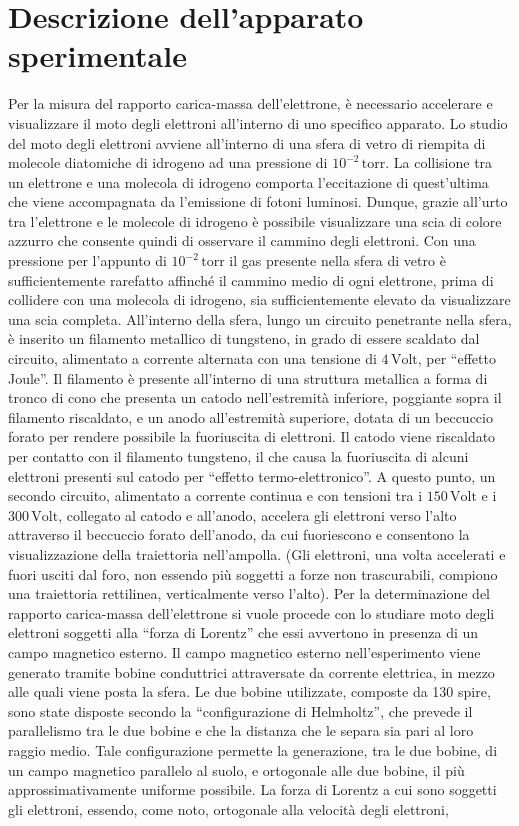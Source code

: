 \documentclass[a4paper,12pt]{article}
\begin{document}
\section{Descrizione dell’apparato sperimentale}
Per la misura del rapporto carica-massa dell’elettrone, è necessario accelerare e visualizzare il moto degli elettroni all’interno di uno specifico apparato. 
Lo studio del moto degli elettroni avviene all’interno di una sfera di vetro di riempita di molecole diatomiche di idrogeno ad una pressione di \(10^{-2} \, \text{torr}\). La collisione tra un elettrone e una molecola di idrogeno comporta l’eccitazione di quest’ultima che viene accompagnata da l’emissione di fotoni luminosi. Dunque, grazie all’urto tra l’elettrone e le molecole di idrogeno è possibile visualizzare una scia di colore azzurro che consente quindi di osservare il cammino degli elettroni. Con una pressione per l’appunto di \(10^{-2} \, \text{torr}\) il gas presente nella sfera di vetro è sufficientemente rarefatto affinché il cammino medio di ogni elettrone, prima di collidere con una molecola di idrogeno, sia sufficientemente elevato da visualizzare una scia completa. All’interno della sfera, lungo un circuito penetrante nella sfera, è inserito un filamento metallico di tungsteno, in grado di essere scaldato dal circuito, alimentato a corrente alternata con una tensione di \(4 \, \text{Volt}\), per “effetto Joule”. Il filamento è presente all’interno di una struttura metallica a forma di tronco di cono che presenta un catodo nell’estremità inferiore, poggiante sopra il filamento riscaldato, e un anodo all’estremità superiore, dotata di un beccuccio forato per rendere possibile la fuoriuscita di elettroni. Il catodo viene riscaldato per contatto con il filamento tungsteno, il che causa la fuoriuscita di alcuni elettroni presenti sul catodo per “effetto termo-elettronico”. A questo punto, un secondo circuito, alimentato a corrente continua e con tensioni tra i \(150 \, \text{Volt}\) e i \(300 \, \text{Volt}\), collegato al catodo e all’anodo, accelera gli elettroni verso l’alto attraverso il beccuccio forato dell’anodo, da cui fuoriescono e consentono la visualizzazione della traiettoria nell’ampolla. (Gli elettroni, una volta accelerati e fuori usciti dal foro, non essendo più soggetti a forze non trascurabili, compiono una traiettoria rettilinea, verticalmente verso l’alto). Per la determinazione del rapporto carica-massa dell’elettrone si vuole procede con lo studiare moto degli elettroni soggetti alla “forza di Lorentz” che essi avvertono in presenza di un campo magnetico esterno. Il campo magnetico esterno nell’esperimento viene generato tramite bobine conduttrici attraversate da corrente elettrica, in mezzo alle quali viene posta la sfera. Le due bobine utilizzate, composte da 130 spire, sono state disposte secondo la “configurazione di Helmholtz”, che prevede il parallelismo tra le due bobine e che la distanza che le separa sia pari al loro raggio medio. Tale configurazione permette la generazione, tra le due bobine, di un campo magnetico parallelo al suolo, e ortogonale alle due bobine, il più approssimativamente uniforme possibile. La forza di Lorentz a cui sono soggetti gli elettroni, essendo, come noto, ortogonale alla velocità degli elettroni, 
\end{document}
